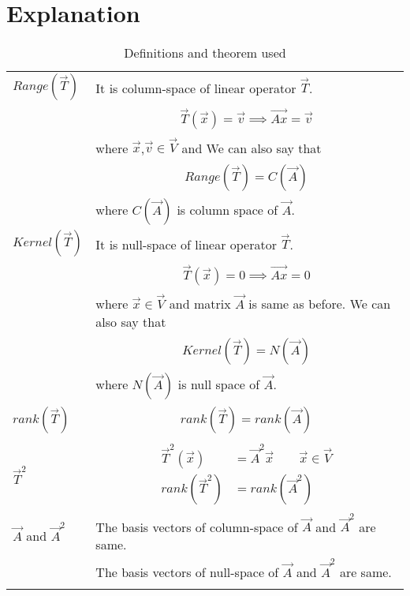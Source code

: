 \documentclass[journal,12pt]{IEEEtran}
\begin{document}
\section{\textbf{Explanation}}
\renewcommand{\thetable}{1}
\begin{longtable}{|l|l|}
\hline
\endhead
$Range(\vec{T})$&It is column-space of linear operator $\vec{T}$.\\&\parbox{15cm}{\begin{align}
    \vec{T}(\vec{x})=\vec{v}
    \implies\vec{Ax}=\vec{v}
\end{align}}\\&where $\vec{x}$,$\vec{v}\in\vec{V}$ and We can also say that\\&\parbox{15cm}{\begin{align}
    Range(\vec{T})=C(\vec{A})\label{R}
\end{align}}\\&where $C(\vec{A})$ is column space of $\vec{A}$.\\
\hline$Kernel(\vec{T})$&It is null-space of linear operator $\vec{T}$.\\&\parbox{15cm}{\begin{align}
    \vec{T}(\vec{x})=0
    \implies\vec{Ax}=0
\end{align}}\\&where $\vec{x}\in\vec{V}$ and matrix $\vec{A}$ is same as before. We can also say that\\&\parbox{15cm}{\begin{align}
    Kernel(\vec{T})=N(\vec{A})\label{K}
\end{align}}\\&where $N(\vec{A})$ is null space of $\vec{A}$.\\
\hline$rank(\vec{T})$&\parbox{15cm}{\begin{align}
    rank(\vec{T})=rank(\vec{A})
\end{align}}\\
\hline$\vec{T}^2$&\parbox{15cm}{\begin{align}
    \vec{T}^2(\vec{x})&=\vec{A}^2\vec{x}\quad\quad\vec{x}\in\vec{V}\\
    rank(\vec{T}^2)&=rank(\vec{A}^2)
\end{align}}\\
\hline$\vec{A}$ and $\vec{A}^2$&The basis vectors of column-space of $\vec{A}$ and $\vec{A}^2$ are same.\\&The basis vectors of null-space of $\vec{A}$ and $\vec{A}^2$ are same.\\
\hline
\caption{Definitions and theorem used}
\label{deftab}
\end{longtable}
\end{document}
